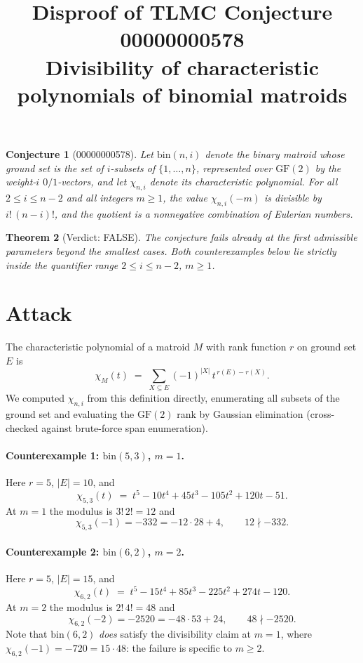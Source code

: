 \documentclass[11pt]{article}
\title{Disproof of TLMC Conjecture 00000000578\\
\large Divisibility of characteristic polynomials of binomial matroids}
\author{}
\date{}
\newtheorem{theorem}{Theorem}
\newtheorem{conjecture}[theorem]{Conjecture}
\begin{document}
\maketitle

\begin{conjecture}[00000000578]
Let $\mathrm{bin}(n,i)$ denote the binary matroid whose ground set is the set
of $i$-subsets of $\{1,\dots,n\}$, represented over $\mathrm{GF}(2)$ by the
weight-$i$ $0/1$-vectors, and let $\chi_{n,i}$ denote its characteristic
polynomial.  For all $2 \le i \le n-2$ and all integers $m \ge 1$, the value
$\chi_{n,i}(-m)$ is divisible by $i!\,(n-i)!$, and the quotient is a
nonnegative combination of Eulerian numbers.
\end{conjecture}

\begin{theorem}[Verdict: FALSE]
The conjecture fails already at the first admissible parameters beyond the
smallest cases.  Both counterexamples below lie strictly inside the quantifier
range $2 \le i \le n-2$, $m \ge 1$.
\end{theorem}

\section{Attack}

The characteristic polynomial of a matroid $M$ with rank function $r$ on
ground set $E$ is
\[
\chi_M(t) \;=\; \sum_{X \subseteq E} (-1)^{|X|}\, t^{\,r(E) - r(X)} .
\]
We computed $\chi_{n,i}$ from this definition directly, enumerating all
subsets of the ground set and evaluating the $\mathrm{GF}(2)$ rank by Gaussian
elimination (cross-checked against brute-force span enumeration).

\paragraph{Counterexample 1: $\mathrm{bin}(5,3)$, $m=1$.}
Here $r = 5$, $|E| = 10$, and
\[
\chi_{5,3}(t) \;=\; t^5 - 10t^4 + 45t^3 - 105t^2 + 120t - 51 .
\]
At $m = 1$ the modulus is $3!\,2! = 12$ and
\[
\chi_{5,3}(-1) = -332 = -12 \cdot 28 + 4, \qquad 12 \nmid -332 .
\]

\paragraph{Counterexample 2: $\mathrm{bin}(6,2)$, $m=2$.}
Here $r = 5$, $|E| = 15$, and
\[
\chi_{6,2}(t) \;=\; t^5 - 15t^4 + 85t^3 - 225t^2 + 274t - 120 .
\]
At $m = 2$ the modulus is $2!\,4! = 48$ and
\[
\chi_{6,2}(-2) = -2520 = -48 \cdot 53 + 24, \qquad 48 \nmid -2520 .
\]
Note that $\mathrm{bin}(6,2)$ \emph{does} satisfy the divisibility claim at
$m=1$, where $\chi_{6,2}(-1) = -720 = 15 \cdot 48$: the failure is specific to
$m \ge 2$.
\end{document}

